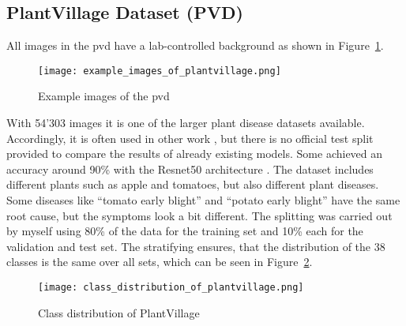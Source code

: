 \subsection{PlantVillage Dataset (PVD)}
All images in the \gls{pvd} have a lab-controlled background as shown in Figure~\ref{fig:example_images_of_plantvillage}. 
\begin{figure}[H]
    \begin{center}
    \texttt{[image: example\_images\_of\_plantvillage.png]}
    \caption{Example images of the \gls{pvd}}\label{fig:example_images_of_plantvillage}
    \end{center}
\end{figure}
With 54'303 images it is one of the larger plant disease datasets available. 
Accordingly, it is often used in other work \autocite{hughes2016}, but there is no official test split provided to compare the results of already existing models. 
Some achieved an accuracy around 90\% with the Resnet50 architecture \autocite{gole2023}.
The dataset includes different plants such as apple and tomatoes, but also different plant diseases. 
Some diseases like ``tomato early blight'' and ``potato early blight'' have the same root cause, but the symptoms look a bit different. 
The splitting was carried out by myself using 80\% of the data for the training set and 10\% each for the validation and test set. 
The stratifying ensures, that the distribution of the 38 classes is the same over all sets, which can be seen in Figure~\ref{fig:class_distribution_of_plantvillage}.
\begin{figure}[H]
    \begin{center}
    \texttt{[image: class\_distribution\_of\_plantvillage.png]}
    \caption{Class distribution of PlantVillage}\label{fig:class_distribution_of_plantvillage}
    \end{center}
\end{figure}

